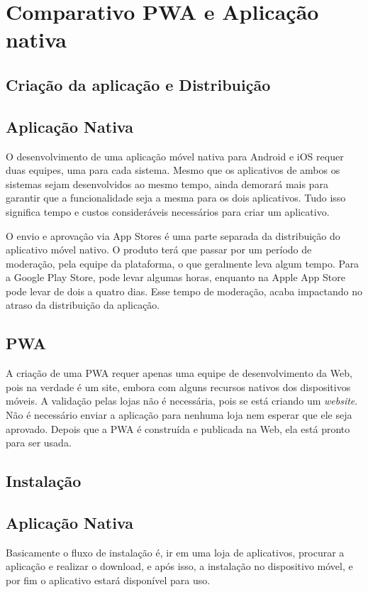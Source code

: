 \section{Comparativo PWA e Aplicação nativa}
\subsection{Criação da aplicação e Distribuição}
\subsection*{Aplicação Nativa}
O desenvolvimento de uma aplicação móvel nativa para Android e iOS requer duas equipes, uma para cada sistema. Mesmo que os aplicativos de ambos os sistemas sejam desenvolvidos ao mesmo tempo, ainda demorará mais para garantir que a funcionalidade seja a mesma para os dois aplicativos. Tudo isso significa tempo e custos consideráveis necessários para criar um aplicativo.

O envio e aprovação via App Stores é uma parte separada da distribuição do aplicativo móvel nativo. O produto terá que passar por um período de moderação, pela equipe da plataforma, o que geralmente leva algum tempo. Para a Google Play Store, pode levar algumas horas, enquanto na Apple App Store pode levar de dois a quatro dias. Esse tempo de moderação, acaba impactando no atraso da distribuição da aplicação.

\subsection*{PWA}
A criação de uma \ac{PWA} requer apenas uma equipe de desenvolvimento da Web, pois na verdade é um site, embora com alguns recursos nativos dos dispositivos móveis. A validação pelas lojas não é necessária, pois se está criando um \textit{website}. Não é necessário enviar a aplicação para nenhuma loja nem esperar que ele seja aprovado. Depois que a \ac{PWA} é construída e publicada na Web, ela está pronto para ser usada.

\subsection{Instalação}
\subsection*{Aplicação Nativa}
Basicamente o fluxo de instalação é, ir em uma loja de aplicativos, procurar a aplicação e realizar o download, e após isso, a instalação no dispositivo móvel, e por fim o aplicativo estará disponível para uso.

